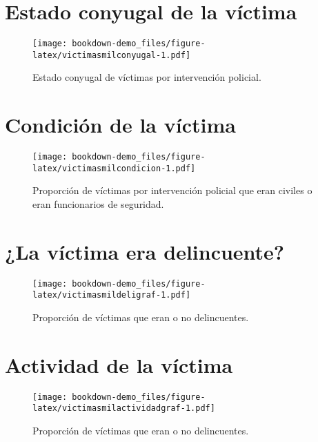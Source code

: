 \documentclass[
]{book}
\begin{document}
\hypertarget{estado-conyugal-de-la-vuxedctima}{%
\section{Estado conyugal de la víctima}\label{estado-conyugal-de-la-vuxedctima}}



\begin{figure}
\centering
\texttt{[image: bookdown-demo\_files/figure-latex/victimasmilconyugal-1.pdf]}
\caption{\label{fig:victimasmilconyugal}Estado conyugal de víctimas por intervención policial.}
\end{figure}

\hypertarget{condiciuxf3n-de-la-vuxedctima}{%
\section{Condición de la víctima}\label{condiciuxf3n-de-la-vuxedctima}}



\begin{figure}
\centering
\texttt{[image: bookdown-demo\_files/figure-latex/victimasmilcondicion-1.pdf]}
\caption{\label{fig:victimasmilcondicion}Proporción de víctimas por intervención policial que eran civiles o eran funcionarios de seguridad.}
\end{figure}

\hypertarget{la-vuxedctima-era-delincuente}{%
\section{¿La víctima era delincuente?}\label{la-vuxedctima-era-delincuente}}



\begin{figure}
\centering
\texttt{[image: bookdown-demo\_files/figure-latex/victimasmildeligraf-1.pdf]}
\caption{\label{fig:victimasmildeligraf}Proporción de víctimas que eran o no delincuentes.}
\end{figure}

\hypertarget{actividad-de-la-vuxedctima}{%
\section{Actividad de la víctima}\label{actividad-de-la-vuxedctima}}



\begin{figure}
\centering
\texttt{[image: bookdown-demo\_files/figure-latex/victimasmilactividadgraf-1.pdf]}
\caption{\label{fig:victimasmilactividadgraf}Proporción de víctimas que eran o no delincuentes.}
\end{figure}
\end{document}
